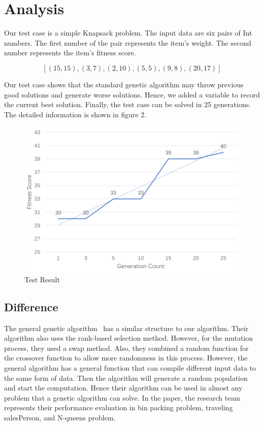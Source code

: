 \documentclass[sigconf]{acmart}
\begin{document}
\section{Analysis}
\label{analysis}
Our test case is a simple Knapsack problem. The input data are six pairs of Int numbers. The first number of the pair represents the item's weight. The second number represents the item's fitness score. 

\[[(15, 15), (3, 7), (2, 10), (5, 5), (9, 8), (20, 17)]\]

Our test case shows that the standard genetic algorithm may throw previous good solutions and generate worse solutions. Hence, we added a variable to record the current best solution. Finally, the test case can be solved in 25 generations. The detailed information is shown in figure 2. 
\begin{figure}
\includegraphics[scale=0.35]{Test Result}
\caption{Test Result}
\end{figure}

\subsection{Difference}
The general genetic algorithm~\cite{choosenPaper} has a similar structure to our algorithm. Their algorithm also uses the rank-based selection method. However, for the mutation process, they used a swap method. Also, they combined a random function for the crossover function to allow more randomness in this process. However, the general algorithm has a general function that can compile different input data to the same form of data. Then the algorithm will generate a random population and start the computation. Hence their algorithm can be used in almost any problem that a genetic algorithm can solve. In the paper, the research team represents their performance evaluation in bin packing problem, traveling salesPerson, and N-queens problem. 
\end{document}
